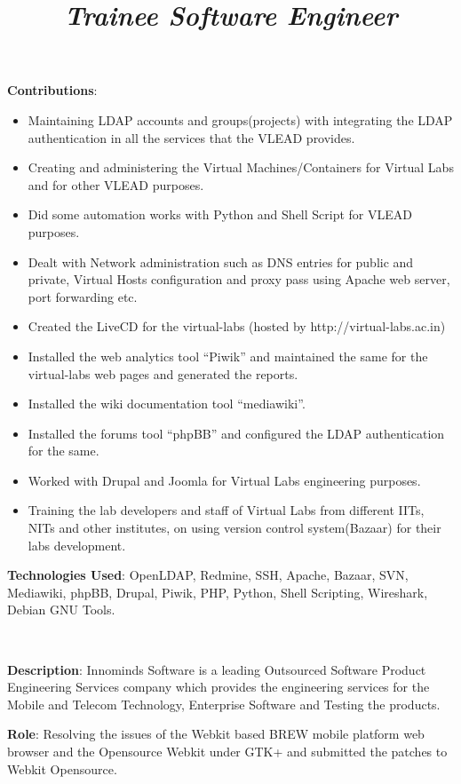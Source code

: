 \begin{resume}
\begin{position}
\textbf{Contributions}:
\begin{itemize}
\item Maintaining LDAP accounts and groups(projects) with integrating
  the LDAP authentication in all the services that the VLEAD provides.
\item Creating and administering the Virtual Machines/Containers for
  Virtual Labs and for other VLEAD purposes.
\item Did some automation works with Python and Shell Script for VLEAD
  purposes.
\item Dealt with Network administration such as DNS entries for public
  and private, Virtual Hosts configuration and proxy pass using Apache
  web server, port forwarding etc.
\item Created the LiveCD for the virtual-labs (hosted by
  http://virtual-labs.ac.in)
\item Installed the web analytics tool ``Piwik'' and maintained the
  same for the virtual-labs web pages and generated the reports.
\item Installed the wiki documentation tool ``mediawiki''.
\item Installed the forums tool ``phpBB'' and configured the LDAP
  authentication for the same.
\item Worked with Drupal and Joomla for Virtual Labs engineering
  purposes.
\item Training the lab developers and staff of Virtual Labs from
  different IITs, NITs and other institutes, on using version control
  system(Bazaar) for their labs development.

\end{itemize}
\textbf{Technologies Used}: OpenLDAP, Redmine, SSH, Apache, Bazaar,
SVN, Mediawiki, phpBB, Drupal, Piwik, PHP, Python, Shell Scripting,
Wireshark, Debian GNU Tools.
\end{position}
\\
\title{\em \textbf{Trainee Software Engineer}}
\begin{position}
\textbf{Description}: Innominds Software is a leading Outsourced
Software Product Engineering Services company which provides the
engineering services for the Mobile and Telecom Technology, Enterprise
Software and Testing the products.
 
\textbf{Role}: Resolving the issues of the Webkit based BREW mobile
platform web browser and the Opensource Webkit under GTK+ and
submitted the patches to Webkit Opensource.


\end{position}
\end{resume}
